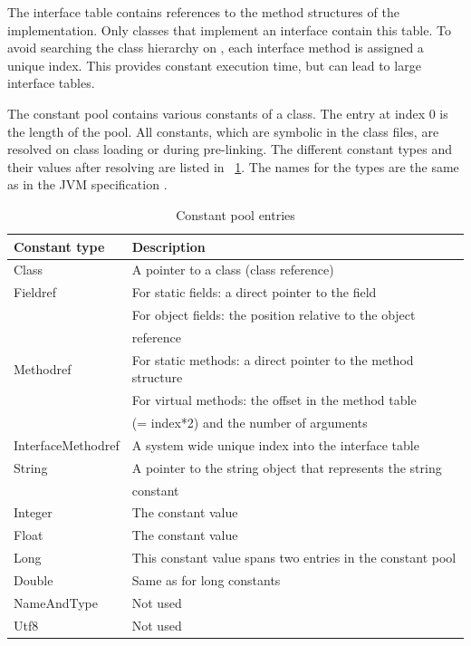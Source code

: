 The interface table contains references to the method structures of
the implementation. Only classes that implement an interface contain
this table. To avoid searching the class hierarchy on
, each interface method is assigned a unique
index. This provides constant execution time, but can lead to large
interface tables.

The constant pool contains various constants of a class. The entry
at index 0 is the length of the pool. All constants, which are
symbolic in the class files, are resolved on class loading or during
pre-linking. The different constant types and their values after
resolving are listed in \tablename~\ref{tab_jvm_const_pool}. The
names for the types are the same as in the JVM specification
\cite{jvm}.


\begin{table}[htbp]
    \centering
    \begin{tabular}{ll}
        \toprule
        Constant type &  Description \\
        \midrule
        Class &  A pointer to a class (class reference) \\
        Fieldref &   For static fields: a direct pointer to the field \\
                &   For object fields: the position relative to the object \\
                & reference \\
        Methodref &  For static methods: a direct pointer to the method structure \\
                & For virtual methods: the offset in the method table \\
                & (= index*2) and the number of arguments \\
        InterfaceMethodref &  A system wide unique index into the interface table \\
        String  & A pointer to the string object that represents the string \\
                & constant \\
        Integer & The constant value \\
        Float   & The constant value \\
        Long    & This constant value spans two entries in the constant pool \\
        Double  & Same as for long constants \\
        NameAndType & Not used \\
        Utf8    & Not used \\
        \bottomrule
    \end{tabular}
    \caption{Constant pool entries}
    \label{tab_jvm_const_pool}
\end{table}

